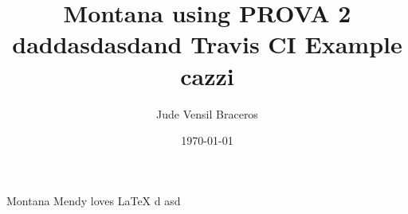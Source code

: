 \documentclass{article}
\title{Montana using PROVA 2 daddasdasdand Travis CI Example cazzi}
\author{Jude Vensil Braceros}
\date{\today}
\begin{document}
\maketitle

Montana Mendy loves LaTeX d asd
\end{document}

